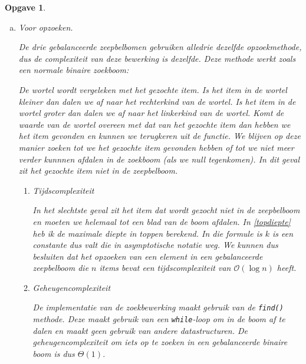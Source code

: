 \documentclass[12pt,hidelinks]{article}
\newtheorem{opgave}{Opgave}
\begin{document}
\begin{opgave}
\begin{enumerate}[a.]
            \item Voor opzoeken.

                \normalfont
                De drie gebalanceerde zeepbelbomen gebruiken alledrie dezelfde opzoekmethode, dus de complexiteit van deze bewerking is dezelfde.
                Deze methode werkt zoals een normale binaire zoekboom: 

                De wortel wordt vergeleken met het gezochte item. Is het item in de wortel kleiner dan dalen we af naar het rechterkind van de wortel. 
                Is het item in de wortel groter dan dalen we af naar het linkerkind van de wortel.
                Komt de waarde van de wortel overeen met dat van het gezochte item dan hebben we het item gevonden en kunnen we terugkeren uit de functie.
                We blijven op deze manier zoeken tot we het gezochte item gevonden hebben of tot we niet meer verder kunnnen afdalen in de zoekboom (als we null tegenkomen).
                In dit geval zit het gezochte item niet in de zeepbelboom.

                \begin{enumerate}
                    \item Tijdscomplexiteit

                        In het slechtste geval zit het item dat wordt gezocht niet in de zeepbelboom en moeten we helemaal tot een blad van de boom afdalen.
                        In \eqref{topdiepte} heb ik de maximale diepte in toppen berekend.
                        In die formule is $k$ is een constante dus valt die in asymptotische notatie weg.
                        We kunnen dus besluiten dat het opzoeken van een element in een gebalanceerde zeepbelboom die $n$ items bevat een tijdscomplexiteit van $\mathcal{O}(\log n)$ heeft.
                    \item Geheugencomplexiteit

                        De implementatie van de zoekbewerking maakt gebruik van de {\tt find()} methode. Deze maakt gebruik van een {\tt while}-loop om in de boom af te dalen en maakt geen gebruik van andere datastructuren.
                        De geheugencomplexiteit om iets op te zoeken in een gebalanceerde binaire boom is dus $\Theta(1)$.
                \end{enumerate}
        \end{enumerate}
    \end{opgave}
\end{document}
